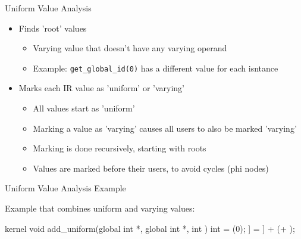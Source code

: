 \begin{frame}{Uniform Value Analysis}

\begin{itemize}
    \item Finds 'root' values
    \begin{itemize}
        \item Varying value that doesn't have any varying operand
        \item Example: \texttt{get\_global\_id(0)} has a different value for each isntance
    \end{itemize}
    \item Marks each IR value as 'uniform' or 'varying'
    \begin{itemize}
        \item All values start as 'uniform'
        \item Marking a value as 'varying' causes all users to also be marked 'varying'
        \item Marking is done recursively, starting with roots
        \item Values are marked before their users, to avoid cycles (phi nodes)
    \end{itemize}
\end{itemize}

\end{frame}


\begin{frame}[fragile]{Uniform Value Analysis Example}

Example that combines uniform and varying values:

\begin{codebox}[commandchars=\\\[\]]
kernel void add_uniform(global int *\codeemphb[dst], global int *\codeemphb[src], int \codeemphb[alpha]) {
    int \codeempha[tid] = (0);
    \codeemphb[dst]\idx[\codeempha[tid]] = \codeemphb[src]\idx[\codeempha[tid]] + (\codeemphb[alpha] + \codeemphb[1]);
}
\end{codebox}


\end{frame}

